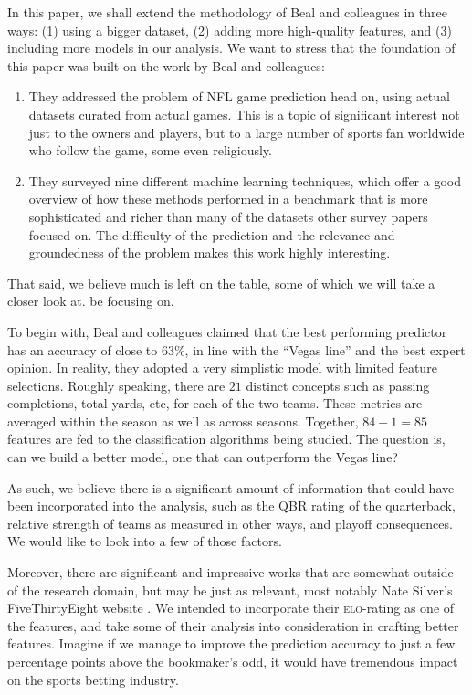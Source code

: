 \documentclass[10pt]{article}
\begin{document}
In this paper,
we shall extend the methodology of Beal and colleagues in three ways: (1) using a
bigger dataset, (2) adding more high-quality features, and (3) including more
models in our analysis.
We want to stress that the foundation of this paper was built on the work by
Beal and colleagues:

\begin{enumerate}
\item They addressed the problem of NFL game prediction head on, using
actual datasets curated from actual games. This is a topic of significant
interest not just to the owners and players, but to a large number of sports fan worldwide
who follow the game, some even religiously.

\item They surveyed nine different machine learning techniques, which
offer a good overview of how these methods performed in a
benchmark that is more sophisticated and richer than many of the
datasets other survey papers focused on. The difficulty of the prediction and the
relevance and groundedness of the problem makes this work highly interesting.
\end{enumerate}

That said, we believe much is left on the table, some of which we will take a closer look at. 
be focusing on.

To begin with, Beal and colleagues claimed that the best performing predictor
has an accuracy of close to $63\%$, in line with the ``Vegas line'' and
the best expert opinion.  In reality,
they adopted a very simplistic model with limited feature selections.
Roughly speaking, there are $21$ distinct concepts such as passing
completions, total yards, etc, for each of the two teams.
These metrics are averaged within the
season as well as across seasons. Together, $84 + 1 = 85$ features are
fed to the classification algorithms being studied. The question is, can we build a better
model, one that can outperform the Vegas line?

As such, we believe there is a significant amount of information that could
have been incorporated into the analysis, such as the QBR rating of the
quarterback, relative strength of teams as measured in other ways, and
playoff consequences. We would like to look into a few of those factors.

Moreover, there are significant and impressive works that are somewhat outside
of the research domain, but may be just as relevant, most notably Nate
Silver's FiveThirtyEight website \cite{Silv2018}. We intended to incorporate
their \textsc{elo}-rating as one of the features, and take some of their
analysis into consideration in crafting better features.
Imagine if we manage to improve the prediction accuracy to just a few percentage
points above the bookmaker's odd, it would have tremendous impact on the sports
betting industry.
\end{document}
